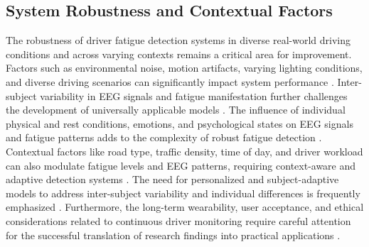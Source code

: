 \subsection{System Robustness and Contextual Factors}
The robustness of driver fatigue detection systems in diverse real-world driving conditions and across varying contexts remains a critical area for improvement.  Factors such as environmental noise, motion artifacts, varying lighting conditions, and diverse driving scenarios can significantly impact system performance \citep{Mehreen_A_2019, Monteiro_T_2019, Nguyen_H_2023, Wang_C_2020_2, Wang_F_2018, Zong_S_2024, Ardabili_S_2024, Ojha_D_2023}.  Inter-subject variability in EEG signals and fatigue manifestation further challenges the development of universally applicable models \citep{Chen_C_2023, Dimitrakopoulos_G_2018, Dong_N_2019, Ghadami_A_2022, Majumder_S_2019, Monteiro_T_2019, Paulo_J_2021, Zhuang_Z_2024, Liu_Y_2016, Gao_Z_2019_2, Hasan_M_2022, Paulo_J_2021}.  The influence of individual physical and rest conditions, emotions, and psychological states on EEG signals and fatigue patterns adds to the complexity of robust fatigue detection \citep{Dimitrakopoulos_G_2018, Dong_N_2019, Min_J_2021, Nugraha_B_2016, Zhang_H_2023_1, Li_P_2023, Zong_S_2024}.  Contextual factors like road type, traffic density, time of day, and driver workload can also modulate fatigue levels and EEG patterns, requiring context-aware and adaptive detection systems \citep{Martensson_H_2019, Mehreen_A_2019, Mu_Q_2021, Zong_S_2024, Guo_Z_2018, Lin_C_2021}.  The need for personalized and subject-adaptive models to address inter-subject variability and individual differences is frequently emphasized \citep{Paulo_J_2021, Wang_F_2020, Wu_D_2017, Feng_W_2024, Gao_D_2024_3, Reddy_T_2022, Zhang_Y_2022_1, Zhao_Y_2021, Shen_M_2021, Zhuang_Z_2024, Li_R_2023_2, Wang_F_2020}.  Furthermore, the long-term wearability, user acceptance, and ethical considerations related to continuous driver monitoring require careful attention for the successful translation of research findings into practical applications \citep{Martensson_H_2019, Nguyen_H_2023, Yin_J_2017, Chung_G_2018, Chung_G_2018_1, Guo_Z_2018, Yin_J_2017}.


